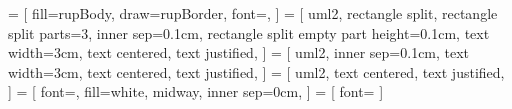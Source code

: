  = [
    fill=rupBody,
    draw=rupBorder,
    font={\ttfamily},
]
 = [ %
    uml2,
    rectangle split,
    rectangle split parts=3,
    inner sep=0.1cm,
    rectangle split empty part height=0.1cm,
    text width=3cm,
    text centered,
    text justified,
]
 = [ %
    uml2,
    inner sep=0.1cm,
    text width=3cm,
    text centered,
    text justified,
]
 = [ %
    uml2,
    text centered,
    text justified,
]
 = [ %
    font={\small\ttfamily},
    fill=white,
    midway,
    inner sep=0cm,
]
 = [ %
    font={\footnotesize\ttfamily}
]
%
\newcommand{\tikzpic}[1]{
    \tikz \node [scale=0.75] {\begin{tikzpicture}#1\end{tikzpicture}};
}
